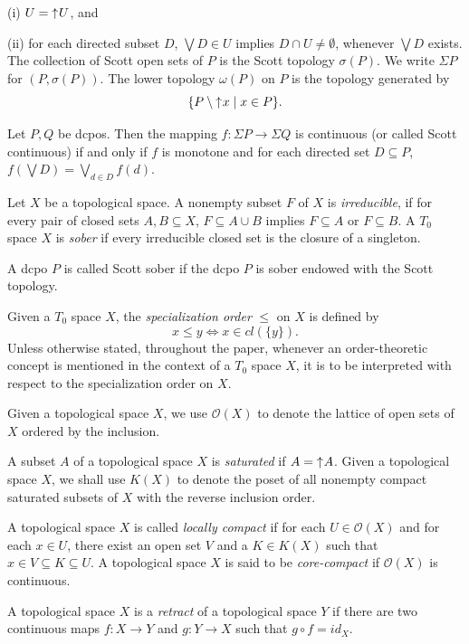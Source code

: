 \documentclass[preprint,12pt]{elsarticle}
\numberwithin{equation}{section}
\newcommand{\up}{\mathord{\uparrow}\hspace{0.05em}}
\begin{document}
 (i) $U=\up U$, and

 (ii) for each directed subset $D$, $\bigvee D\in U$ implies
$D\cap U\neq \emptyset$, whenever $\bigvee D$ exists.\\
The collection of Scott open sets of $P$ is the Scott topology $\sigma(P)$. We write $\Sigma P$ for $(P,\sigma(P))$. The lower topology $\omega(P)$ on $P$ is the topology generated by   $$\{P\setminus\up x\mid x\in P\}.$$

\quad Let $P,Q$ be dcpos. Then the mapping $f:\Sigma P\longrightarrow \Sigma Q$ is continuous (or called Scott continuous) if and only if $f$ is monotone and for each directed set $D\subseteq P$, $f(\bigvee D)=\bigvee\limits_{d\in D}f(d)$.

\quad Let $X$ be a topological space. A nonempty subset $F$ of $X$ is {\em irreducible}, if for every pair of closed sets $A, B\subseteq X$, $F\subseteq A\cup B$ implies $F\subseteq A$ or $F\subseteq B$. A $T_{0}$ space $X$ is {\em sober} if every irreducible closed set is the closure of a singleton.

\quad A dcpo $P$ is called Scott sober if the dcpo $P$ is sober endowed with the Scott topology.

\quad Given a $T_{0}$ space $X$, the {\em specialization order} $\leq$ on $X$ is defined by
$$x\leq y \Longleftrightarrow x\in cl(\{y\}).$$
Unless otherwise stated, throughout
the paper, whenever an order-theoretic concept is mentioned in the context of a $T_{0}$ space $X$, it is to be interpreted with respect to the specialization order on $X$.

\quad Given a topological space $X$, we use $\mathcal{O}(X)$ to denote the lattice of open sets of $X$ ordered by the inclusion.


\quad A subset $A$ of a topological space $X$ is {\em saturated} if $A=\up A$. Given a topological space $X$, we shall use $K(X)$ to denote the poset of all nonempty
compact saturated subsets of $X$ with the reverse inclusion order.

\quad A topological space $X$ is called {\em locally compact} if for each $U\in \mathcal{O}(X)$ and for each $x\in U$, there exist an open set $V$ and a $K\in K(X)$ such that $x\in V\subseteq K\subseteq U$. A topological space $X$ is said to be  {\em core-compact } if  $\mathcal{O}(X)$ is continuous.

\quad A topological space $X$ is a {\em retract} of a topological space $Y$ if there are two continuous maps $f:X\longrightarrow Y$ and $g:Y\longrightarrow X$ such that $g\circ f=id_{X}$.
\end{document}
